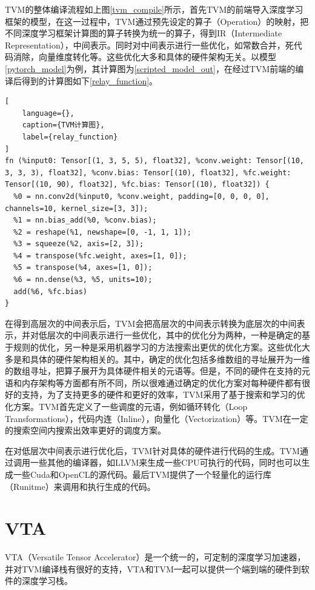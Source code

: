 TVM的整体编译流程如上图\ref{tvm_compile}所示，首先TVM的前端导入深度学习框架的模型，在这一过程中，TVM通过预先设定的算子（Operation）的映射，把不同深度学习框架计算图的算子转换为统一的算子，得到IR（Intermediate Representation），中间表示。同时对中间表示进行一些优化，如常数合并，死代码消除，向量维度转化等。这些优化大多和具体的硬件架构无关。以模型\ref{pytorch_model}为例，其计算图为\ref{scripted_model_out}，在经过TVM前端的编译后得到的计算图如下\ref{relay_function}。

\begin{lstlisting}[
    language={},
    caption={TVM计算图},
    label={relay_function}
]
fn (%input0: Tensor[(1, 3, 5, 5), float32], %conv.weight: Tensor[(10, 3, 3, 3), float32], %conv.bias: Tensor[(10), float32], %fc.weight: Tensor[(10, 90), float32], %fc.bias: Tensor[(10), float32]) {
  %0 = nn.conv2d(%input0, %conv.weight, padding=[0, 0, 0, 0], channels=10, kernel_size=[3, 3]);
  %1 = nn.bias_add(%0, %conv.bias);
  %2 = reshape(%1, newshape=[0, -1, 1, 1]);
  %3 = squeeze(%2, axis=[2, 3]);
  %4 = transpose(%fc.weight, axes=[1, 0]);
  %5 = transpose(%4, axes=[1, 0]);
  %6 = nn.dense(%3, %5, units=10);
  add(%6, %fc.bias)
}
\end{lstlisting}

在得到高层次的中间表示后，TVM会把高层次的中间表示转换为底层次的中间表示，并对低层次的中间表示进行一些优化，其中的优化分为两种，一种是确定的基于规则的优化，另一种是采用机器学习的方法搜索出更优的优化方案。这些优化大多是和具体的硬件架构相关的。其中，确定的优化包括多维数组的寻址展开为一维的数组寻址，把算子展开为具体硬件相关的元语等。但是，不同的硬件在支持的元语和内存架构等方面都有所不同，所以很难通过确定的优化方案对每种硬件都有很好的支持，为了支持更多的硬件和更好的效率，TVM采用了基于搜索和学习的优化方案。TVM首先定义了一些调度的元语，例如循环转化（Loop Transformations），代码内连（Inline），向量化（Vectorization）等。TVM在一定的搜索空间内搜索出效率更好的调度方案。

在对低层次中间表示进行优化后，TVM针对具体的硬件进行代码的生成。TVM通过调用一些其他的编译器，如LLVM来生成一些CPU可执行的代码，同时也可以生成一些Cuda和OpenCL的源代码。最后TVM提供了一个轻量化的运行库（Runitme）来调用和执行生成的代码。


\section{VTA}


VTA（Versatile Tensor Accelerator）是一个统一的，可定制的深度学习加速器，并对TVM编译栈有很好的支持，VTA和TVM一起可以提供一个端到端的硬件到软件的深度学习栈。


